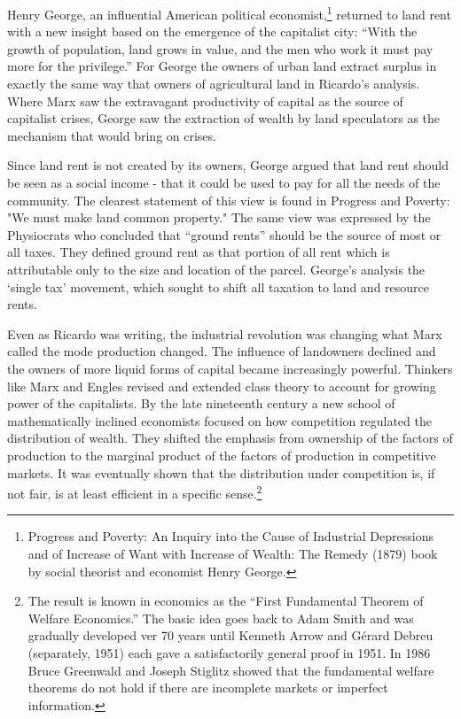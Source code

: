   Henry George, an influential American political economist,\footnote{Progress and Poverty: An Inquiry into the Cause of Industrial Depressions and of Increase of Want with Increase of Wealth: The Remedy (1879) book by social theorist and economist Henry George.}  returned to land rent with a new insight based on the emergence of the capitalist city: ``With the growth of population, land grows in value, and the men who work it must pay more for the privilege.'' For George the owners of urban land extract surplus in exactly the same way that owners of agricultural land in Ricardo's analysis. Where Marx saw the extravagant productivity of capital as the source of capitalist crises, George saw the extraction of wealth by land speculators as the mechanism that would bring on crises.
  
  Since land rent is not created by its owners, George argued that land rent should be seen as a social income - that it could be used to pay for all the needs of the community. The clearest statement of this view is found in Progress and Poverty: "We must make land common property." The same view was expressed by the Physiocrats who concluded  that ``ground rents'' should be the source of most or all taxes. They defined ground rent as that portion of all rent which is attributable only to the size and location of the parcel. George's analysis the `single tax' movement, which sought to shift all taxation to land  and resource rents.   

  
Even as Ricardo was writing, the industrial revolution was changing what Marx called the mode production changed. The influence of landowners declined and the owners of more liquid forms of capital became increasingly powerful. Thinkers like Marx and Engles revised and extended  class theory to account for growing power of the capitalists.  By the late nineteenth  century a new school of mathematically inclined economists focused on how competition regulated the distribution of wealth. They shifted the emphasis from ownership of the factors of production to the marginal product of the factors of production in competitive markets. It was eventually shown that the distribution under competition is, if not fair,  is at least efficient in a specific sense.\footnote{The result is known  in economics as the ``First Fundamental Theorem of Welfare Economics.'' The basic idea goes back to Adam Smith and was gradually developed  ver 70 years until Kenneth Arrow and Gérard Debreu (separately, 1951) each gave  a satisfactorily general proof in 1951. In 1986 %
Bruce Greenwald and Joseph Stiglitz showed that the fundamental welfare theorems do not hold if there are incomplete markets or imperfect information.}

